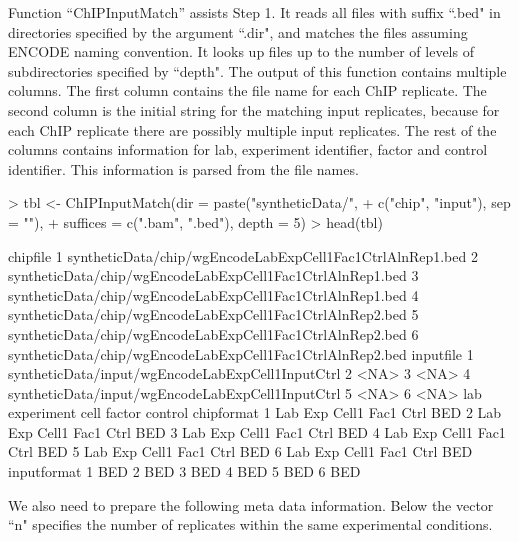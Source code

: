 \documentclass[a4paper,10pt]{article}
\begin{document}
Function ``ChIPInputMatch'' assists Step 1. It reads all files with suffix ``.bed" in directories specified by the argument ``.dir", and matches the files assuming ENCODE naming convention. It looks up files up to the number of levels of subdirectories specified by ``depth". The output of this function contains multiple columns. The first column contains the file name for each ChIP replicate. The second column is the initial string for the matching input replicates, because for each ChIP replicate there are possibly multiple input replicates. The rest of the columns contains information for lab, experiment identifier, factor and control identifier. This information is parsed from the file names.

\begin{Schunk}
\begin{Sinput}
> tbl <- ChIPInputMatch(dir = paste("syntheticData/",
+                         c("chip", "input"), sep = ""),
+                       suffices = c(".bam", ".bed"), depth = 5)
> head(tbl)
\end{Sinput}
\begin{Soutput}
                                                   chipfile
1 syntheticData/chip/wgEncodeLabExpCell1Fac1CtrlAlnRep1.bed
2 syntheticData/chip/wgEncodeLabExpCell1Fac1CtrlAlnRep1.bed
3 syntheticData/chip/wgEncodeLabExpCell1Fac1CtrlAlnRep1.bed
4 syntheticData/chip/wgEncodeLabExpCell1Fac1CtrlAlnRep2.bed
5 syntheticData/chip/wgEncodeLabExpCell1Fac1CtrlAlnRep2.bed
6 syntheticData/chip/wgEncodeLabExpCell1Fac1CtrlAlnRep2.bed
                                         inputfile
1 syntheticData/input/wgEncodeLabExpCell1InputCtrl
2                                             <NA>
3                                             <NA>
4 syntheticData/input/wgEncodeLabExpCell1InputCtrl
5                                             <NA>
6                                             <NA>
  lab experiment  cell factor control chipformat
1 Lab        Exp Cell1   Fac1    Ctrl        BED
2 Lab        Exp Cell1   Fac1    Ctrl        BED
3 Lab        Exp Cell1   Fac1    Ctrl        BED
4 Lab        Exp Cell1   Fac1    Ctrl        BED
5 Lab        Exp Cell1   Fac1    Ctrl        BED
6 Lab        Exp Cell1   Fac1    Ctrl        BED
  inputformat
1         BED
2         BED
3         BED
4         BED
5         BED
6         BED
\end{Soutput}
\end{Schunk}

We also need to prepare the following meta data information. Below the vector ``n" specifies the number of replicates within the same experimental conditions.
\end{document}
